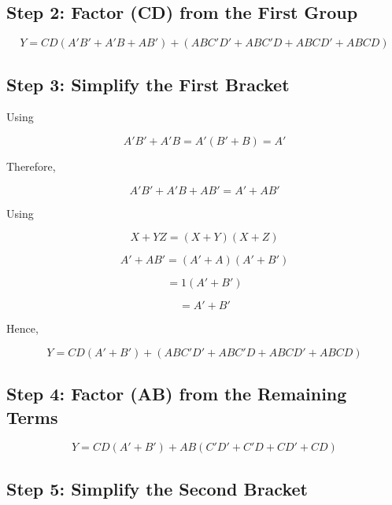 \documentclass[12pt,a4paper]{article}
\begin{document}
\subsection*{Step 2: Factor (CD) from the First Group}

\begin{equation}
Y=
CD(A'B'+A'B+AB')
+
(ABC'D'+ABC'D+ABCD'+ABCD)
\end{equation}

\subsection*{Step 3: Simplify the First Bracket}

Using

\begin{equation}
A'B'+A'B=A'(B'+B)=A'
\end{equation}

Therefore,

\begin{equation}
A'B'+A'B+AB'=A'+AB'
\end{equation}

Using

\begin{equation}
X+YZ=(X+Y)(X+Z)
\end{equation}

\begin{equation}
A'+AB'=(A'+A)(A'+B')
\end{equation}

\begin{equation}
=1(A'+B')
\end{equation}

\begin{equation}
=A'+B'
\end{equation}

Hence,

\begin{equation}
Y=
CD(A'+B')
+
(ABC'D'+ABC'D+ABCD'+ABCD)
\end{equation}

\subsection*{Step 4: Factor (AB) from the Remaining Terms}

\begin{equation}
Y=
CD(A'+B')
+
AB(C'D'+C'D+CD'+CD)
\end{equation}

\subsection*{Step 5: Simplify the Second Bracket}
\end{document}
